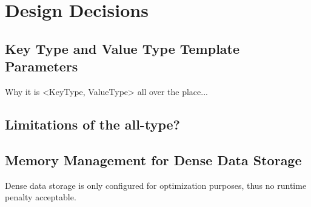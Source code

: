 \chapter{Design Decisions} \label{chap:design}

\section{Key Type and Value Type Template Parameters}
Why it is <KeyType, ValueType> all over the place...

\section{Limitations of the all-type?}


\section{Memory Management for Dense Data Storage}
Dense data storage is only configured for optimization purposes, thus no runtime penalty acceptable.